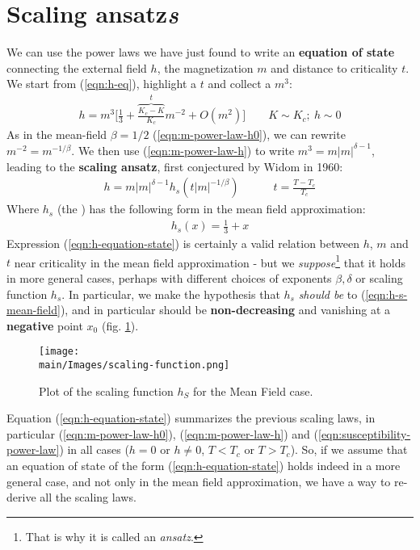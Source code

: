 \documentclass[../../main.tex]{subfiles}
\begin{document}
\section{Scaling ansatz\textit{s}}
We can use the power laws we have just found to write an \textbf{equation of state} connecting the external field $h$, the magnetization $m$ and distance to criticality $t$. 
We start from (\ref{eqn:h-eq}), highlight a $t$ and collect a $m^3$:
\begin{align*}
    h = m^3 \Bigg[\frac{1}{3} + \overbrace{\frac{K_c - K}{K_c}}^{t}m^{-2} + O(m^2) \Bigg] \qquad K \sim K_c;\> h\sim 0
\end{align*}
As in the mean-field $\beta = 1/2$ (\ref{eqn:m-power-law-h0}), we can rewrite $m^{-2} = m^{-1/\beta}$. We then use (\ref{eqn:m-power-law-h}) to write $m^3 = m|m|^{\delta-1}$, leading to the \textbf{scaling ansatz}, first conjectured by Widom in 1960:
\begin{align}\label{eqn:h-equation-state}
    h = m|m|^{\delta -1} h_s(t|m|^{-1/\beta}) \qquad  \quad t = \frac{T-T_c}{T_c}  
\end{align}
Where $h_s$ (the ) has the following form in the mean field approximation:
\begin{align}
    h_s(x) = \frac{1}{3} + x
    \label{eqn:h-s-mean-field}
\end{align}
Expression (\ref{eqn:h-equation-state}) is certainly a valid relation between $h$, $m$ and $t$ near criticality in the mean field approximation - but we \textit{suppose}\footnote{That is why it is called an \textit{ansatz}.} that it holds in more general cases, perhaps with different choices of exponents $\beta, \delta$ or scaling function $h_s$. In particular, we make the hypothesis that $h_s$ \textit{should be } to (\ref{eqn:h-s-mean-field}), and in particular should be \textbf{non-decreasing} and vanishing at a \textbf{negative} point $x_0$  (fig. \ref{fig:scaling-function}).

\begin{figure}[H]
    \centering
    \texttt{[image: \\main/Images/scaling-function.png]}
    \caption{Plot of the scaling function $h_S$ for the Mean Field case.}
    \label{fig:scaling-function}
\end{figure}

Equation (\ref{eqn:h-equation-state}) summarizes the previous scaling laws, in particular (\ref{eqn:m-power-law-h0}), (\ref{eqn:m-power-law-h}) and (\ref{eqn:susceptibility-power-law}) in all cases ($h=0$ or $h\neq 0$, $T < T_c$ or $T > T_c$). So, if we assume that an equation of state of the form (\ref{eqn:h-equation-state}) holds indeed in a more general case, and not only in the mean field approximation, we have a way to re-derive all the scaling laws.
\end{document}
